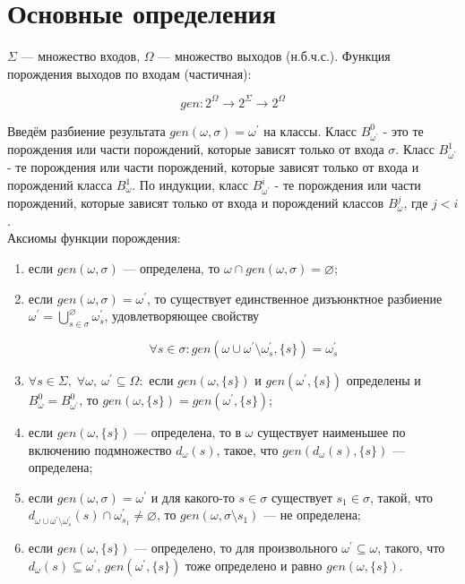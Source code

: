 \section{Основные определения}

$\Sigma$ --- множество входов, $\Omega$ --- множество выходов (н.б.ч.с.). Функция порождения
выходов по входам (частичная):

$$
gen : 2^\Omega\to 2^\Sigma\to 2^\Omega
$$

Введём разбиение результата $gen(\omega, \sigma) = \omega^\prime$ на классы. Класс $B^0_{\omega^\prime}$ - это те порождения или части порождений, которые зависят только от входа $\sigma$. Класс $B^1_{\omega^\prime}$ - те порождения или части порождений, которые зависят только от входа и порождений класса $B^1_{\omega}$. По индукции, класс $B^i_{\omega^\prime}$ - те порождения или части порождений, которые зависят только от входа и порождений классов $B^j_{\omega}$, где $j < i$.\\

Аксиомы функции порождения:

\begin{enumerate}
	\item если $gen(\omega,\sigma)$ --- определена, то $\omega\cap gen(\omega,\sigma)=\varnothing$;
	
	\item если $gen(\omega,\sigma)=\omega^\prime$, то существует единственное дизъюнктное разбиение $\omega^\prime=\bigcup^\varnothing_{s\in\sigma}\omega^\prime_s$, 
	удовлетворяющее свойству 

	$$\forall s\in\sigma : gen(\omega\cup\omega^\prime\setminus\omega^\prime_s,\{s\})=\omega^\prime_s$$

	\item $\forall s\in\Sigma,\; \forall\omega,\:\omega^\prime\subseteq\Omega:$ если $gen(\omega,\{s\})$ и $gen(\omega^\prime,\{s\})$ определены и $B^0_{\omega} = B^0_{\omega^\prime}$, то $gen(\omega,\{s\}) = gen(\omega^\prime,\{s\})$;

	\item если $gen(\omega,\{s\})$ --- определена, то в $\omega$ существует наименьшее по включению подмножество $d_\omega(s)$, такое, что
	$gen(d_\omega(s), \{s\})$ --- определена;

	\item если $gen(\omega,\sigma)=\omega^\prime$ и для какого-то $s\in\sigma$ существует $s_1\in\sigma$, такой, что
	$d_{\omega\cup\omega^\prime\setminus\omega^\prime_s}(s) \cap \omega^\prime_{s_1}\ne\varnothing$, 
	то $gen(\omega,\sigma\setminus s_1)$ --- не определена;
	
	\item если $gen(\omega,\{s\})$ --- определено, то для произвольного $\omega^\prime\subseteq\omega$, такого, что $d_\omega(s)\subseteq\omega^\prime$, $gen(\omega^\prime, \{s\})$ тоже определено и равно $gen(\omega,\{s\})$.
\end{enumerate}